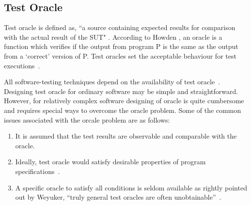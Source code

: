 



\subsection{Test Oracle}
Test oracle is defined as, ``a source containing expected results for comparison with the actual result of the SUT" \cite{ahmed2010software}. According to Howden \cite{howden1986}, an oracle is a function which verifies if the output from program P is the same as the output from a ‘correct’ version of P. Test oracles set the acceptable behaviour for test executions~\cite{baresi2001test}. 

All software-testing techniques depend on the availability of test oracle~\cite{gaudel2010software}. Designing test oracle for ordinary software may be simple and straightforward. However, for relatively complex software designing of oracle is quite cumbersome and requires special ways to overcome the oracle problem. Some of the common issues associated with the orcale problem are as follows:
\begin{enumerate}
\item It is assumed that the test results are observable and comparable with the oracle.
\item Ideally, test oracle would satisfy desirable properties of program specifications~\cite{baresi2001test}.
\item A specific oracle to satisfy all conditions is seldom available as rightly pointed out by Weyuker, ``truly general test oracles are often unobtainable''~\cite{weyuker1982testing}. 
\end{enumerate}

